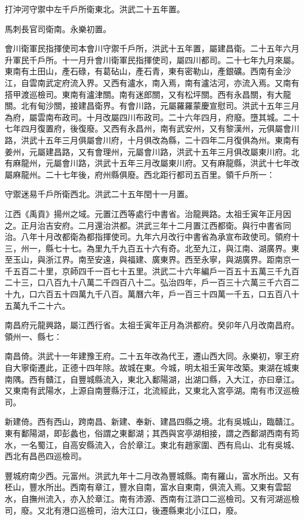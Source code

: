 打沖河守禦中左千戶所衛東北。洪武二十五年置。

馬刺長官司衛南。永樂初置。

會川衛軍民指揮使司本會川守禦千戶所，洪武十五年置，屬建昌衛。二十五年六月升軍民千戶所。十一月升會川衛軍民指揮使司，屬四川都司。二十七年九月來屬。東南有土田山，產石碌，有葛砧山，產石青，東有密勒山，產銀礦。西南有金沙江，自雲南武定府流入界。又西有瀘水，南入焉，南有瀘沽河，亦流入焉。又南有搭甲渡巡檢司。東南有瀘津關。南有迷郎關，又有松坪關。西有永昌關，有大龍關。北有甸沙關，接建昌衛界。有會川路，元屬羅羅蒙慶宣慰司。洪武十五年三月為府，屬雲南布政司。十月改屬四川布政司。二十六年四月，府廢。墮其城。二十七年四月復置府，後復廢。又西有永昌州，南有武安州，又有黎漢州，元俱屬會川路，洪武十五年三月俱屬會川府，十月俱改為縣，二十四年二月復俱為州。東南有姜州，元屬建昌路，又有會理州，元屬會川路，洪武十五年三月俱改屬東川府。北有麻龍州，元屬會川路，洪武十五年三月改屬東川府。又有麻龍縣，洪武十七年改屬麻龍州。二十七年後，府州縣俱廢。西北距行都司五百里。領千戶所一：

守禦迷易千戶所衛西北。洪武二十五年閏十一月置。

江西《禹貢》揚州之域。元置江西等處行中書省。治龍興路。太祖壬寅年正月因之。正月治吉安府。二月還治洪都。洪武三年十二月置江西都衛。與行中書省同治。八年十月改都衛為都指揮使司。九年六月改行中書省為承宣布政使司。領府十三，州一，縣七十七。為里九千九百五十六有奇。北至九江，與江南、湖廣界。東至玉山，與浙江界。南至安遠，與福建、廣東界。西至永寧，與湖廣界。距南京一千五百二十里，京師四千一百七十五里。洪武二十六年編戶一百五十五萬三千九百二十三，口八百九十八萬二千四百八十二。弘治四年，戶一百三十六萬三千六百二十九，口六百五十四萬九千八百。萬曆六年，戶一百三十四萬一千五，口五百八十五萬九千二十六。

南昌府元龍興路，屬江西行省。太祖壬寅年正月為洪都府。癸卯年八月改南昌府。領州一、縣七：

南昌倚。洪武十一年建豫王府。二十五年改為代王，遷山西大同。永樂初，寧王府自大寧衛遷此，正德十四年除。故城在東。今城，明太祖壬寅年改築。東湖在城東南隅。西有贛江，自豐城縣流入，東北入鄱陽湖，出湖口縣，入大江，亦曰章江。又東南有武陽水，上源自南豐縣汙江，北流經此，又東北入宮亭湖。南有市汊巡檢司。

新建倚。西有西山，跨南昌、新建、奉新、建昌四縣之境。北有吳城山，臨贛江。東有鄱陽湖，即彭蠡也，俗謂之東鄱湖；其西與宮亭湖相接，謂之西鄱湖西南有筠水，一名蜀江，自高安縣流入，合於章江。東北有趙家圍、西有烏山、北有吳城、西北有昌邑四巡檢司。

豐城府南少西。元富州。洪武九年十二月改為豐城縣。南有羅山，富水所出。又有柸山，豐水所出。西南有章江，豐水自南，富水自東南，俱流入焉。又東有雲韶水，自撫州流入，亦入於章江。南有沛源、西南有江滸口二巡檢司。又有河湖巡檢司，廢。又北有港口巡檢司，治大江口，後遷縣東北小江口，廢。

